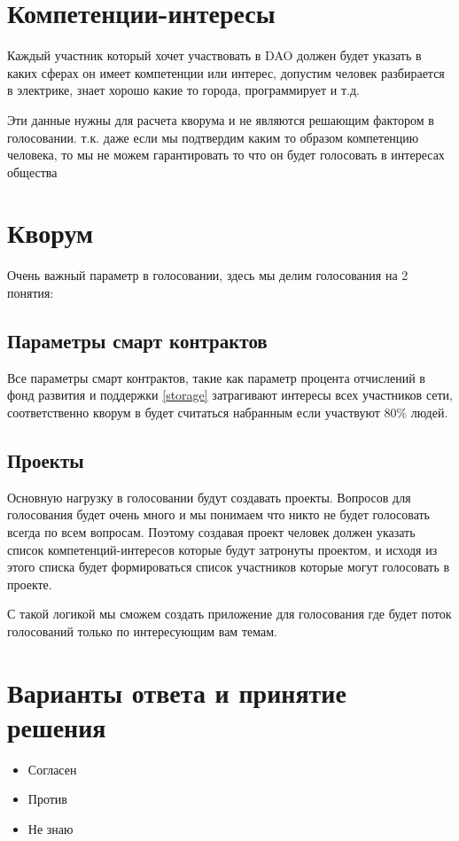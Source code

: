 \documentclass[a4paper,12pt]{report}
\begin{document}
\section{Компетенции-интересы}
Каждый участник который хочет участвовать в DAO должен будет указать в каких сферах он имеет компетенции или интерес, допустим человек разбирается в электрике, знает хорошо какие то города, программирует и т.д.

Эти данные нужны для расчета кворума и не являются решающим фактором в голосовании.  т.к. даже если мы подтвердим каким то образом компетенцию человека, то мы не можем гарантировать то что он будет голосовать в интересах общества

\section{Кворум}
	
Очень важный параметр в голосовании, здесь мы делим голосования на 2 понятия:

\subsection{Параметры смарт контрактов}
Все параметры смарт контрактов, такие как параметр процента отчислений в фонд развития и поддержки \ref{storage} затрагивают интересы всех участников сети, соответственно кворум в будет считаться набранным если участвуют 80\% людей. 

\subsection{Проекты}
Основную нагрузку в голосовании будут создавать проекты. Вопросов для голосования будет очень много и мы понимаем что никто не будет голосовать всегда по всем вопросам. Поэтому создавая проект человек должен указать список компетенций-интересов которые будут затронуты проектом, и исходя из этого списка будет формироваться список участников которые могут голосовать в проекте. 

С такой логикой мы сможем создать приложение для голосования где будет поток голосований только по интересующим вам темам. 

\section{Варианты ответа и принятие решения}

\begin{itemize}
	\item Согласен
	\item Против
	\item Не знаю
\end{itemize}
\end{document}
